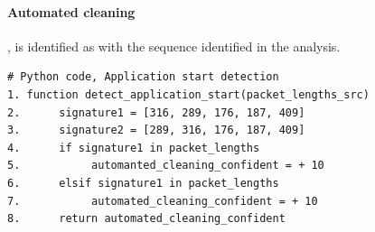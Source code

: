 \paragraph{Automated cleaning}, is identified as with the sequence identified in the analysis. 
\begin{lstlisting}
# Python code, Application start detection
1. function detect_application_start(packet_lengths_src)
2.      signature1 = [316, 289, 176, 187, 409]
3.      signature2 = [289, 316, 176, 187, 409]
4.      if signature1 in packet_lengths
5.           automanted_cleaning_confident = + 10
6.      elsif signature1 in packet_lengths
7.           automated_cleaning_confident = + 10
8.      return automated_cleaning_confident
\end{lstlisting}


